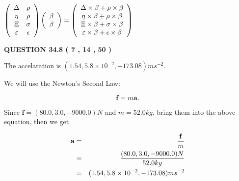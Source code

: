\documentclass[12pt]{article}
\begin{document}
$  %
 \left( \begin{array}
 {
 c
 c
 }
 \Delta & 
 \rho \\ 
 \eta & 
 \rho \\ 
                    \Xi & 
 \sigma \\ 
 \varepsilon & 
 \epsilon
 \end{array} \right)
 \left( \begin{array}
 {
 c
 }
 \beta \\ 
 \beta
 \end{array} \right)
=
 \left( \begin{array}
 {
 c
 }
  \Delta \times  \beta +  \rho \times  \beta \\ 
  \eta \times  \beta +  \rho \times  \beta \\ 
                     \Xi \times  \beta +  \sigma \times  \beta \\ 
  \varepsilon \times  \beta +  \epsilon \times  \beta
 \end{array} \right)
$
 
 
 
 
 
\noindent{}

 
 
  
\vspace{0.2in}
  
{\textbf{\Large{QUESTION
34.8 
 (           7 ,          14 ,          50 )
}}}
  
  
 
 
\noindent{}
 
 
  The accelaration is $  %
(
1.54,
5.8 \times 10^{-2},
-173.08)
ms^{-2} $.
 
 
 
 
 
 
\noindent{}

We will use the Newton's Second Law:
 
\[
\mathbf{f}=m\mathbf{a}.
\]
 
Since $\mathbf{f}= %
(80.0 , 3.0 , -9000.0) N$
and $m= %
52.0kg$, bring them into the above equation, then we get
 
\begin{eqnarray*}
\mathbf{a}&=&\frac{\mathbf{f}}m  \\
&=&\frac{ %
(80.0 , 3.0 , -9000.0) N}{ %
52.0kg}  \\
&=& %
(1.54 , 5.8 \times 10^{-2} , -173.08) ms^{-2}
\end{eqnarray*}
 
\end{document}
